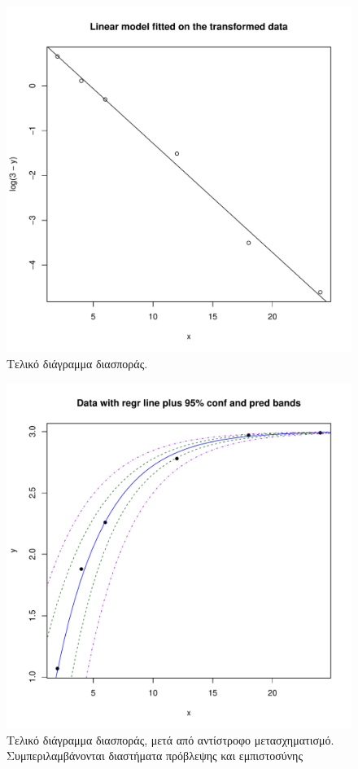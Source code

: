 \documentclass{article}
\begin{document}
\begin{figure}[h]
    \centering
    \includegraphics[width=1.0\textwidth]{part-c-scatter-transformed.pdf}
    \caption{Τελικό διάγραμμα διασποράς.}
    \label{fig:part-c-scatter-transformed}
\end{figure}
\begin{figure}[h]
    \centering
    \includegraphics[width=1.0\textwidth]{part-c-scatter-transformed-detransformed.pdf}
    \caption{Τελικό διάγραμμα διασποράς, μετά από αντίστροφο μετασχηματισμό. Συμπεριλαμβάνονται διαστήματα πρόβλεψης και εμπιστοσύνης}
    \label{fig:part-c-scatter-transformed-detransformed}
\end{figure}
\end{document}
